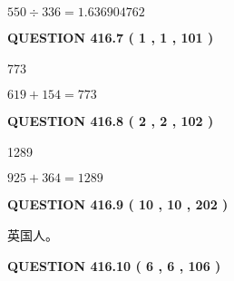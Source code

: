 \documentclass{ctexart}
\begin{document}
 
\noindent{}

$ %
550 \div  %
336=   %
1.636904762$
 
 
  
\vspace{0.2in}
  
{\textbf{\Large{QUESTION
416.7 
 ( 1 , 1 , 101 )
}}}
  
  
 
 
\noindent{}

773
 
 
 
 
\noindent{}

$ %
619 +  %
154=   %
773$
 
 
  
\vspace{0.2in}
  
{\textbf{\Large{QUESTION
416.8 
 ( 2 , 2 , 102 )
}}}
  
  
 
 
\noindent{}

1289
 
 
 
 
\noindent{}

$ %
925 +  %
364=   %
1289$
 
 
  
\vspace{0.2in}
  
{\textbf{\Large{QUESTION
416.9 
 ( 10 , 10 , 202 )
}}}
  
  
 
 
\noindent{}
 
 
英国人。
 
 
 
 
  
\vspace{0.2in}
  
{\textbf{\Large{QUESTION
416.10 
 ( 6 , 6 , 106 )
}}}
  
  
 
 
\noindent{}
\end{document}
